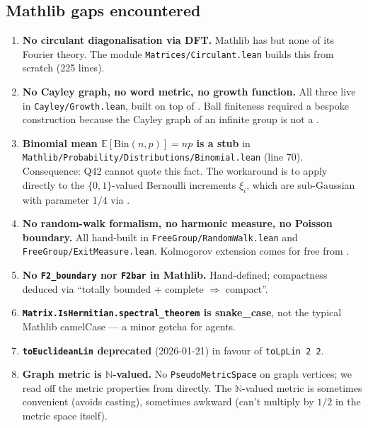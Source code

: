 \documentclass[11pt,a4paper]{article}
\newcommand{\lmod}[1]{\texttt{\small #1}}
\newcommand{\N}{\mathbb{N}}
\theoremstyle{plain}
\theoremstyle{definition}
\begin{document}
\subsection{Mathlib gaps encountered}
\begin{enumerate}[leftmargin=1.3em]
\item \textbf{No circulant diagonalisation via DFT.} Mathlib has
       but none of its Fourier theory. The module
      \lmod{Matrices/Circulant.lean} builds this from scratch (225 lines).
\item \textbf{No Cayley graph, no word metric, no growth function.} All
      three live in \lmod{Cayley/Growth.lean}, built on top of
      . Ball finiteness required a bespoke
       construction because the Cayley graph of an
      infinite group is not a .
\item \textbf{Binomial mean $\mathbb E[\text{Bin}(n,p)] = np$ is a
       stub} in
      \lmod{Mathlib/Probability/Distributions/Binomial.lean} (line 70).
      Consequence: Q42 cannot quote this fact. The workaround is to
      apply  directly to
      the $\{0,1\}$-valued Bernoulli increments $\xi_i$, which are
      sub-Gaussian with parameter $1/4$ via
      .
\item \textbf{No random-walk formalism, no harmonic measure, no Poisson
      boundary.} All hand-built in \lmod{FreeGroup/RandomWalk.lean} and
      \lmod{FreeGroup/ExitMeasure.lean}. Kolmogorov extension comes for
      free from .
\item \textbf{No \texttt{F2\_boundary} nor \texttt{F2bar} in Mathlib.}
      Hand-defined; compactness deduced via
      ``totally bounded + complete $\Rightarrow$ compact''.
\item \textbf{\texttt{Matrix.IsHermitian.spectral\_theorem} is snake\_case},
      not the typical Mathlib camelCase --- a minor gotcha for agents.
\item \textbf{\texttt{toEuclideanLin} deprecated} (2026-01-21) in favour
      of \texttt{toLpLin 2 2}.
\item \textbf{Graph metric is $\N$-valued.} No \texttt{PseudoMetricSpace}
      on graph vertices; we read off the metric properties from
       directly. The $\N$-valued metric is
      sometimes convenient (avoids casting), sometimes awkward (can't
      multiply by $1/2$ in the metric space itself).
\end{enumerate}
\end{document}
